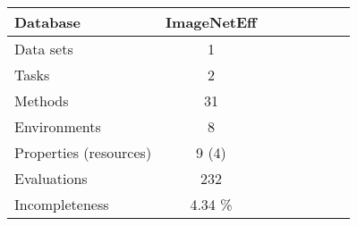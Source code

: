 
    \begin{tabular}{lccccccc}
        \toprule 
        Database & ImageNetEff \\
        \midrule
        Data sets & 1 \\
        Tasks & 2 \\
        Methods & 31 \\
        Environments & 8 \\
        Properties (resources) & 9 (4) \\
        Evaluations & 232 \\
        Incompleteness &  4.34 \% \\
        \bottomrule
    \end{tabular}